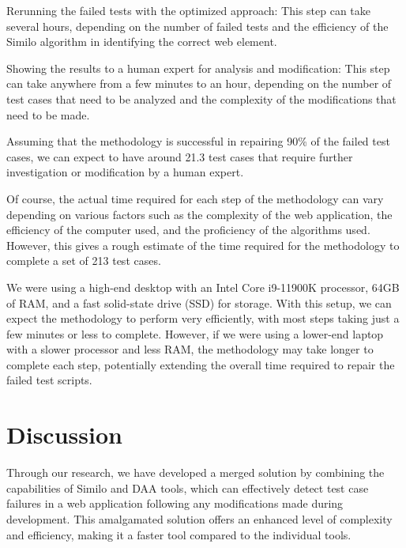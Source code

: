 \documentclass{article}
\begin{document}
Rerunning the failed tests with the optimized approach: This step can take several hours, depending on the number of failed tests and the efficiency of the Similo algorithm in identifying the correct web element.

Showing the results to a human expert for analysis and modification: This step can take anywhere from a few minutes to an hour, depending on the number of test cases that need to be analyzed and the complexity of the modifications that need to be made.

Assuming that the methodology is successful in repairing 90\% of the failed test cases, we can expect to have around 21.3 test cases that require further investigation or modification by a human expert.

Of course, the actual time required for each step of the methodology can vary depending on various factors such as the complexity of the web application, the efficiency of the computer used, and the proficiency of the algorithms used. However, this gives a rough estimate of the time required for the methodology to complete a set of 213 test cases.

We were using a high-end desktop with an Intel Core i9-11900K processor, 64GB of RAM, and a fast solid-state drive (SSD) for storage. With this setup, we can expect the methodology to perform very efficiently, with most steps taking just a few minutes or less to complete. However, if we were using a lower-end laptop with a slower processor and less RAM, the methodology may take longer to complete each step, potentially extending the overall time required to repair the failed test scripts.

\maketitle

\section{Discussion}

Through our research, we have developed a merged solution by combining the capabilities of Similo\cite{similo} and DAA\cite{fuzzy_ai_in_web_testing} tools, which can effectively detect test case failures in a web application following any modifications made during development. This amalgamated solution offers an enhanced level of complexity and efficiency, making it a faster tool compared to the individual tools.
\end{document}

